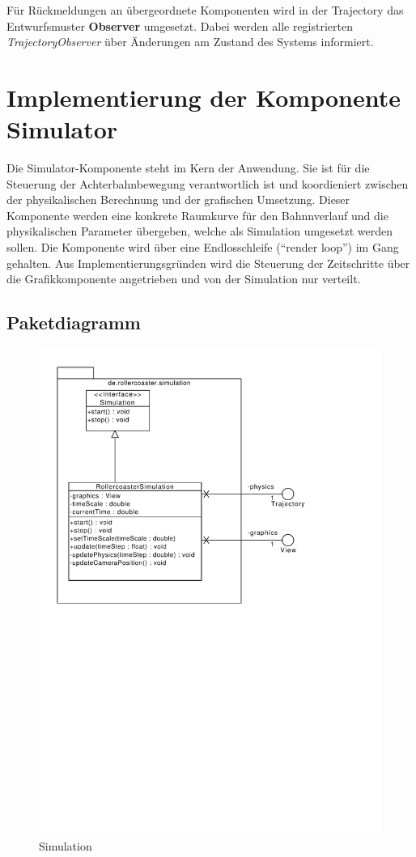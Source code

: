 Für Rückmeldungen an übergeordnete Komponenten wird in der Trajectory das Entwurfsmuster
\textbf{Observer} umgesetzt. Dabei werden alle registrierten \emph{TrajectoryObserver}
über Änderungen am Zustand des Systems informiert.

\section{Implementierung der Komponente Simulator}

Die Simulator-Komponente steht im Kern der Anwendung. Sie ist für die Steuerung der
Achterbahnbewegung verantwortlich ist und koordieniert zwischen der physikalischen 
Berechnung und der grafischen Umsetzung. Dieser Komponente werden eine konkrete 
Raumkurve für den Bahnnverlauf und die physikalischen Parameter übergeben, welche
als Simulation umgesetzt werden sollen. Die Komponente wird über eine 
Endlosschleife (``render loop'') im Gang gehalten. Aus Implementierungsgründen wird
die Steuerung der Zeitschritte über die Grafikkomponente angetrieben und von der
Simulation nur verteilt.

\subsection{Paketdiagramm}
\begin{figure}
\includegraphics[width=\linewidth]{bilder/Simulation}
\caption{Simulation}
\end{figure}

